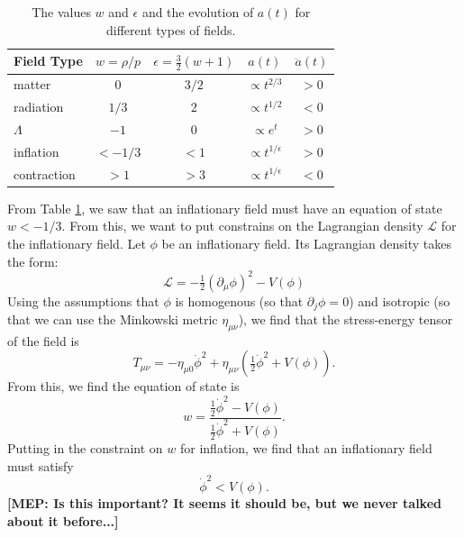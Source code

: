\documentclass[onecolumn,apj]{emulateapj}
\def\L{\mathscr{L}}
\def\half{\tfrac{1}{2}}
\newcommand{\mep}[1]{{\color{applegreen} \textbf{[MEP:  #1]}}}
\begin{document}
\begin{table}[htbp]
   \centering
   \begin{tabular}{@{} lcccc @{}} %
      \toprule
      Field Type & $w=\rho/p$ &  $\epsilon=\tfrac{3}{2}(w+1)$ & $a(t)$ & $\ddot a(t)$ \\
      \midrule
      matter & 0 & $3/2$ & $\propto t^{2/3}$ & $>0$ \\
       radiation & $1/3$ & $2$ & $\propto t^{1/2}$ & $<0$ \\
       $\Lambda$ & $-1$ & $0$ & $\propto e^t$ & $>0$ \\
       inflation & $<-1/3$ & $<1$ & $\propto t^{1/\epsilon}$ & $>0$ \\
       contraction & $>1$ & $>3$ & $\propto t^{1/\epsilon}$ & $<0$ \\
      \bottomrule
   \end{tabular}
   \caption{The values $w$ and $\epsilon$ and the evolution of $a(t)$ for different types of fields.}
   \label{tab:field_scenarios}
\end{table}


From Table \ref{tab:field_scenarios}, we saw that an inflationary field must have an equation of state $w<-1/3$. From this, we want to put constrains on the Lagrangian density $\L$ for the inflationary field. Let $\phi$ be an inflationary field. Its Lagrangian density takes the form:
\begin{equation}
\L = -\half ( \partial_\mu \phi)^2 - V(\phi)
\end{equation}
Using the assumptions that $\phi$ is homogenous (so that $\partial_j \phi = 0$) and isotropic (so that we can use the Minkowski metric $\eta_{\mu\nu}$), we find that the stress-energy tensor of the field is
\begin{equation}
T_{\mu\nu} = -\eta_{\mu 0} \dot \phi^2 + \eta_{\mu\nu}(\half\dot \phi^2+V(\phi)).
\end{equation}
From this, we find the equation of state is
\begin{equation}
w = \frac{\half \dot \phi^2 - V(\phi)}{\half \dot \phi^2 + V(\phi)}.
\label{eqn:w}
\end{equation}
Putting in the constraint on $w$ for inflation, we find that an inflationary field must satisfy 
\begin{equation}
\dot \phi^2 < V(\phi).
\end{equation}
\mep{Is this important? It seems it should be, but we never talked about it before...}
\end{document}
